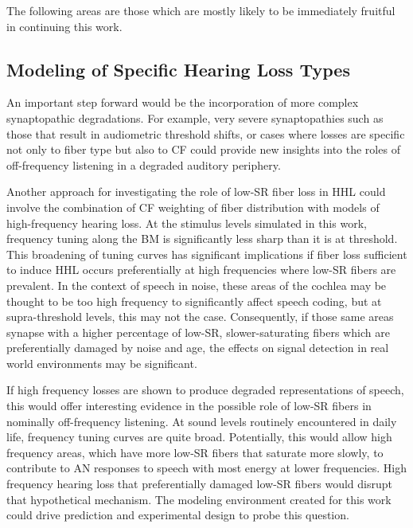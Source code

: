 The following areas are those which are mostly likely to be immediately fruitful in continuing this work.
\label{sec:future_directions}
\subsection{Modeling of Specific Hearing Loss Types} %
\label{sub:modeling_of_specific_hearing_loss_types}
An important step forward would be the incorporation of more complex synaptopathic degradations.  For example, very severe synaptopathies such as those that result in audiometric threshold shifts, or cases where losses are specific not only to fiber type but also to CF could provide new insights into the roles of off-frequency listening in a degraded auditory periphery.

Another approach for investigating the role of low-SR fiber loss in HHL could involve the combination of CF weighting of fiber distribution with models of high-frequency hearing loss.  At the stimulus levels simulated in this work, frequency tuning along the BM is significantly less sharp than it is at threshold.  This broadening of tuning curves has significant implications if fiber loss sufficient to induce HHL occurs preferentially at high frequencies where low-SR fibers are prevalent.   In the context of speech in noise, these areas of the cochlea may be thought to be too high frequency to significantly affect speech coding, but at supra-threshold levels, this may not the case. Consequently, if those same areas synapse with a higher percentage of low-SR, slower-saturating fibers which are preferentially damaged by noise and age, the effects on signal detection in real world environments may be significant. 

If high frequency losses are shown to produce degraded representations of speech, this would offer interesting evidence in the possible role of low-SR fibers in nominally off-frequency listening.  At sound levels routinely encountered in daily life, frequency tuning curves are quite broad.  Potentially, this would allow high frequency areas, which have more low-SR fibers that saturate more slowly, to contribute to AN responses to speech with most energy at lower frequencies.  High frequency hearing loss that preferentially damaged low-SR fibers would disrupt that hypothetical mechanism.  The modeling environment created for this work could drive prediction and experimental design to probe this question. 

